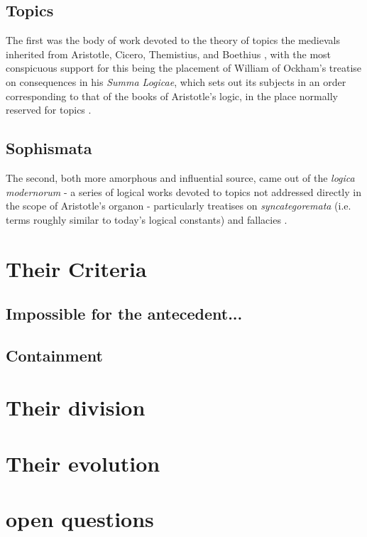 \documentclass[]{article}
\begin{document}
\subsection{Topics}
The first was the body of work devoted to the theory of topics the medievals inherited from Aristotle, 
Cicero, 
Themistius, 
and Boethius \autocite{Stump1982}, 
with the most conspicuous support for this being the placement of William of Ockham's treatise on consequences in his \emph{Summa Logicae}, 
which sets out its subjects in an order corresponding to that of the books of Aristotle's logic, 
in the place normally reserved for topics \autocite{OckhamSL}.

\subsection{Sophismata}
The second, both more amorphous and influential source, 
came out of the \emph{logica modernorum} 
- a series of logical works devoted to topics not addressed directly in the scope of Aristotle's organon 
- particularly treatises on 
\emph{syncategoremata} (i.e. terms roughly similar to today's logical constants) 
and fallacies
\autocite{Green-Pedersen1984,Spruyt2018}.

\section{Their Criteria}

\subsection{Impossible for the antecedent...}

\subsection{Containment}

\section{Their division}


\section{Their evolution}

\section{open questions}

\printbibliography
\end{document}
